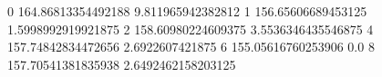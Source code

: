 0 164.86813354492188 9.811965942382812
1 156.65606689453125 1.5998992919921875
2 158.60980224609375 3.5536346435546875
4 157.74842834472656 2.6922607421875
6 155.05616760253906 0.0
8 157.70541381835938 2.6492462158203125
